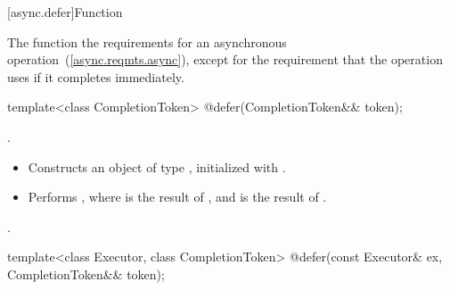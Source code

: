 [async.defer]{Function }

%
\pnum
\begin{note} The function   the requirements for an asynchronous operation~(\ref{async.reqmts.async}), except for the requirement that the operation uses  if it completes immediately. \end{note}

\begin{itemdecl}
template<class CompletionToken>
  @\DEDUCED@ defer(CompletionToken&& token);
\end{itemdecl}

\begin{itemdescr}
\pnum
\completionsig {}.

\pnum
\effects
\begin{itemize}
\item
 Constructs an object  of type , initialized with .
\item
 Performs , where  is the result of , and  is the result of .
\end{itemize}

\pnum
\returns {}.
\end{itemdescr}

\begin{itemdecl}
template<class Executor, class CompletionToken>
  @\DEDUCED@ defer(const Executor& ex, CompletionToken&& token);
\end{itemdecl}

